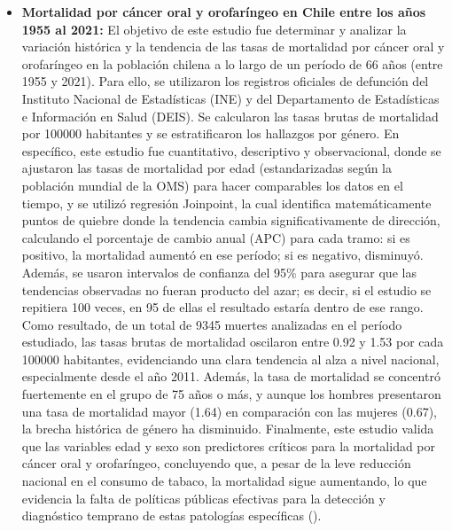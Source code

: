 \begin{itemize}
\item \textbf{Mortalidad por cáncer oral y orofaríngeo en Chile entre los años 1955 al 2021:} El objetivo de este estudio fue determinar y analizar la variación histórica y la tendencia de las tasas de mortalidad por cáncer oral y orofaríngeo en la población chilena a lo largo de un período de 66 años (entre 1955 y 2021). Para ello, se utilizaron los registros oficiales de defunción del Instituto Nacional de Estadísticas (INE) y del Departamento de Estadísticas e Información en Salud (DEIS). Se calcularon las tasas brutas de mortalidad por 100000 habitantes y se estratificaron los hallazgos por género. En específico, este estudio fue cuantitativo, descriptivo y observacional, donde se ajustaron las tasas de mortalidad por edad (estandarizadas según la población mundial de la OMS) para hacer comparables los datos en el tiempo, y se utilizó regresión Joinpoint, la cual identifica matemáticamente puntos de quiebre donde la tendencia cambia significativamente de dirección, calculando el porcentaje de cambio anual (APC) para cada tramo: si es positivo, la mortalidad aumentó en ese período; si es negativo, disminuyó. Además, se usaron intervalos de confianza del 95\% para asegurar que las tendencias observadas no fueran producto del azar; es decir, si el estudio se repitiera 100 veces, en 95 de ellas el resultado estaría dentro de ese rango. Como resultado, de un total de 9345 muertes analizadas en el período estudiado, las tasas brutas de mortalidad oscilaron entre 0.92 y 1.53 por cada 100000 habitantes, evidenciando una clara tendencia al alza a nivel nacional, especialmente desde el año 2011. Además, la tasa de mortalidad se concentró fuertemente en el grupo de 75 años o más, y aunque los hombres presentaron una tasa de mortalidad mayor (1.64) en comparación con las mujeres (0.67), la brecha histórica de género ha disminuido. Finalmente, este estudio valida que las variables edad y sexo son predictores críticos para la mortalidad por cáncer oral y orofaríngeo, concluyendo que, a pesar de la leve reducción nacional en el consumo de tabaco, la mortalidad sigue aumentando, lo que evidencia la falta de políticas públicas efectivas para la detección y diagnóstico temprano de estas patologías específicas (\cite{scielo2}).

\end{itemize}

